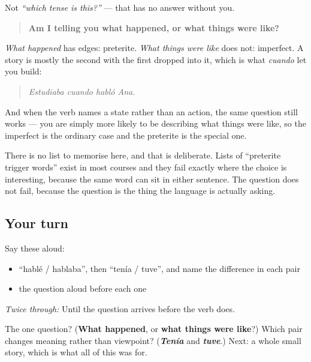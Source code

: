 \begin{grammarlens}[title={Grammar Lens: the question to actually ask}]
Not \emph{\textquotedblleft{}which tense is this?\textquotedblright{}} — that has no answer without you.

\begin{quote}
\textbf{Am I telling you what happened, or what things were like?}
\end{quote}

\emph{What happened} has edges: preterite. \emph{What things were like} does not: imperfect. A story is mostly the second with the first dropped into it, which is what \emph{cuando} let you build:

\begin{quote}
\emph{Estudiaba cuando habló Ana.}
\end{quote}

And when the verb names a state rather than an action, the same question still works — you are simply more likely to be describing what things were like, so the imperfect is the ordinary case and the preterite is the special one.

There is no list to memorise here, and that is deliberate. Lists of \textquotedblleft{}preterite trigger words\textquotedblright{} exist in most courses and they fail exactly where the choice is interesting, because the same word can sit in either sentence. The question does not fail, because the question is the thing the language is actually asking.
\end{grammarlens}

\subsection*{Your turn}
Say these aloud:

\begin{itemize}
\raggedright
  \item \textquotedblleft{}hablé / hablaba\textquotedblright{}, then \textquotedblleft{}tenía / tuve\textquotedblright{}, and name the difference in each pair
  \item the question aloud before each one
\end{itemize}

\emph{Twice through:} Until the question arrives before the verb does.

\begin{tcolorbox}[breakable,colback=teal!4,colframe=teal!35!black,title={Before you move on}]
The one question? (\textbf{What happened}, or \textbf{what things were like}?) Which pair changes meaning rather than viewpoint? (\emph{\textbf{Tenía}} and \emph{\textbf{tuve}}.) Next: a whole small story, which is what all of this was for.
\end{tcolorbox}

